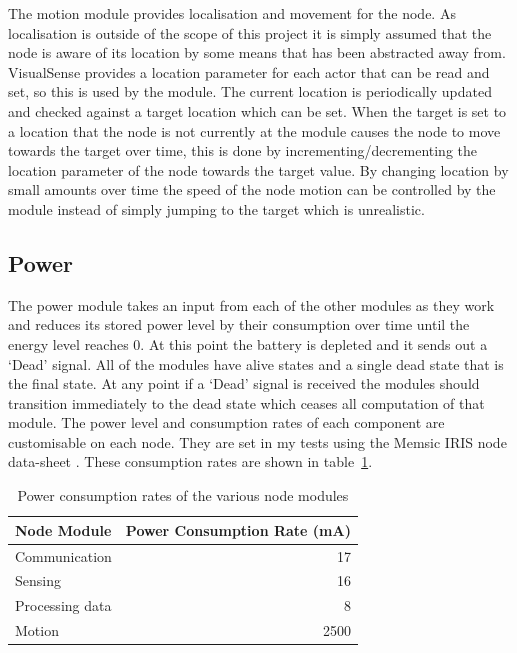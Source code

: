 \documentclass[authoryearcitations]{UoYCSproject}
\begin{document}
The motion module provides localisation and movement for the node. As localisation is outside of the scope of this project it is simply assumed that the node is aware of its location by some means that has been abstracted away from. VisualSense provides a location parameter for each actor that can be read and set, so this is used by the module. The current location is periodically updated and checked against a target location which can be set. When the target is set to a location that the node is not currently at the module causes the node to move towards the target over time, this is done by incrementing/decrementing the location parameter of the node towards the target value. By changing location by small amounts over time the speed of the node motion can be controlled by the module instead of simply jumping to the target which is unrealistic.

\subsection{Power}

The power module takes an input from each of the other modules as they work and reduces its stored power level by their consumption over time until the energy level reaches 0. At this point the battery is depleted and it sends out a `Dead' signal. All of the modules have alive states and a single dead state that is the final state. At any point if a `Dead' signal is received the modules should transition immediately to the dead state which ceases all computation of that module. The power level and consumption rates of each component are customisable on each node. They are set in my tests using the Memsic IRIS node data-sheet \citep{Memsic2011}. These consumption rates are shown in table~\ref{tab:powerRates}.

\begin{table}[]
\centering
\begin{tabular}{@{}lr@{}}
\toprule
Node Module     & Power Consumption Rate (mA) \\ \midrule
Communication   & 17                          \\
Sensing         & 16                          \\
Processing data & 8                           \\
Motion          & 2500                        \\ \bottomrule
\end{tabular}
\caption{Power consumption rates of the various node modules}
\label{tab:powerRates}
\end{table}
\end{document}
